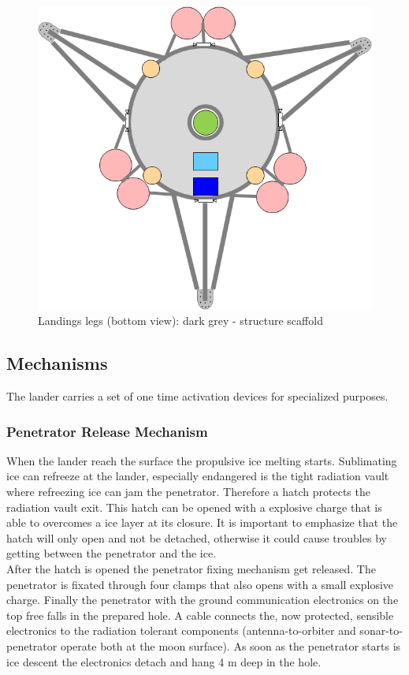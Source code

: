 \begin{figure}[htb]
	\centering
	\includegraphics[width=\textwidth]{Lander/aaronlandinglegs}
	\caption{Landings legs (bottom view): dark grey - structure scaffold \label{fig:alanderlegs}}
\end{figure}

\subsection{Mechanisms}
The lander carries a set of one time activation devices for specialized purposes.

\subsubsection{Penetrator Release Mechanism}
When the lander reach the surface the propulsive ice melting starts. Sublimating ice can refreeze at the lander, especially endangered is the tight radiation vault where refreezing ice can jam the penetrator. Therefore a hatch protects the radiation vault exit. This hatch can be opened with a explosive charge that is able to overcomes a ice layer at its closure. It is important to emphasize that the hatch will only open and not be detached, otherwise it could cause troubles by getting between the penetrator and the ice.\\
After the hatch is opened the penetrator fixing mechanism get released. The penetrator is fixated through four clamps that also opens with a small explosive charge. Finally the penetrator with the ground communication electronics on the top free falls in the prepared hole. A cable connects the, now protected, sensible electronics to the radiation tolerant components (antenna-to-orbiter and sonar-to-penetrator operate both at the moon surface). As soon as the penetrator starts is ice descent the electronics detach and hang 4 m deep in the hole.\\


